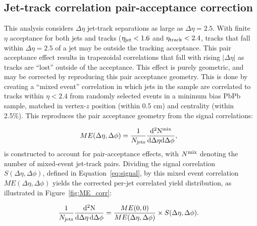 \clearpage

\subsection{Jet-track correlation pair-acceptance correction}

This analysis considers $\Delta\eta$ jet-track separations as large as $\Delta\eta = 2.5$.  With finite $\eta$ acceptance for both jets and tracks ($\eta_{\rm jet} < 1.6$ and $\eta_{\rm track} < 2.4$, tracks that fall within $\Delta\eta = 2.5$ of a jet may be outside the tracking acceptance.  This pair acceptance effect results in trapezoidal correlations that fall with rising $|\Delta\eta|$ as tracks are ``lost'' outside of the acceptance.  This effect is purely geometric, and may be corrected by reproducing this pair acceptance geometry.  This is done by creating a ``mixed event'' correlation in which jets in the sample are correlated to tracks within $\eta < 2.4$ from randomly selected events in a minimum bias PbPb sample, matched in vertex-$z$ position (within 0.5 cm) and centrality (within 2.5\%).  This reproduces the pair acceptance geometry from the signal correlations: 
  
  \begin{equation}
  \label{eq:background}
  ME(\Delta\eta,\Delta\phi) = \frac{1}{N_{\rm jets}}\frac{\rm d^{2}N^{\rm mix}}{\rm d\Delta\eta d\Delta\phi},
  \end{equation}
  is constructed to account for pair-acceptance effects, with $N^{\rm mix}$ denoting the number of mixed-event jet-track pairs.  Dividing the signal correlation $S(\Delta\eta,\Delta\phi)$, defined in Equation~\ref{eq:signal}, by this mixed event correlation $ME(\Delta\eta,\Delta\phi)$ yields the corrected per-jet correlated yield distribution, as illustrated in Figure~\ref{fig:ME_corr}: 

  \begin{equation}
  \label{2pcorr_incl}
  \frac{1}{N_{\rm jets}}\frac{\rm d^{2} N}{\rm d\Delta\eta\, \rm d\Delta\phi}
  = \frac{ME(0,0)}{ME(\Delta\eta,\Delta\phi)}\times S(\Delta\eta,\Delta\phi).
  \end{equation}
  
